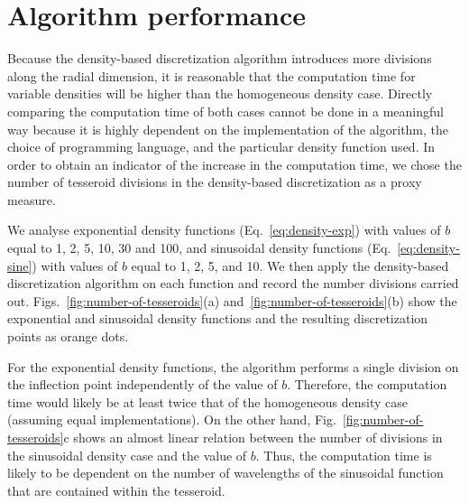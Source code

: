 \documentclass[extra, referee]{gji}
\begin{document}

\section{Algorithm performance}

Because the density-based discretization algorithm introduces more divisions along the
radial dimension, it is reasonable that the computation time for variable densities will
be higher than the homogeneous density case.
Directly comparing the computation time of both cases cannot be done in a meaningful
way because it is highly dependent on the implementation of the algorithm,
the choice of programming language, and the particular density function used.
In order to obtain an indicator of the increase in the computation time,
we chose the number of tesseroid divisions in the density-based discretization as a
proxy measure.

We analyse exponential density functions (Eq.~\ref{eq:density-exp}) with values of $b$ equal to
1, 2, 5, 10, 30 and 100, and sinusoidal density functions (Eq.~\ref{eq:density-sine}) with
values of $b$ equal to 1, 2, 5, and 10.
We then apply the density-based discretization algorithm on each function and record the
number divisions carried out.
Figs.~\ref{fig:number-of-tesseroids}(a) and~\ref{fig:number-of-tesseroids}(b) show the
exponential and sinusoidal density functions and the resulting discretization points as
orange dots.

For the exponential density functions, the algorithm performs a single division on the
inflection point independently of the value of $b$.
Therefore, the computation time would likely be at least twice that of the homogeneous
density case (assuming equal implementations).
On the other hand, Fig.~\ref{fig:number-of-tesseroids}c shows an almost linear relation
between the number of divisions in the sinusoidal density case and the value of $b$.
Thus, the computation time is likely to be dependent on the number of wavelengths
of the sinusoidal function that are contained within the tesseroid.
\end{document}
